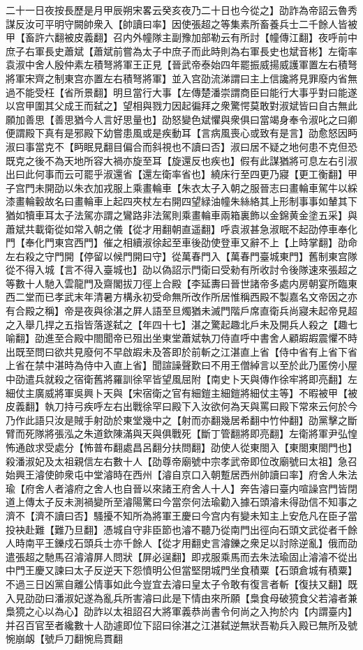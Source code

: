二十一日夜按長歷是月甲辰朔宋畧云癸亥夜乃二十日也今從之】劭詐為帝詔云魯秀謀反汝可平明守闕帥衆入【帥讀曰率】因使張超之等集素所畜養兵士二千餘人皆被甲【畜許六翻被皮義翻】召内外幢隊主副豫加部勒云有所討【幢傳江翻】夜呼前中庶子右軍長史蕭斌【蕭斌前嘗為太子中庶子而此時則為右軍長史也斌音彬】左衛率袁淑中舍人殷仲素左積弩將軍王正見【晉武帝泰始四年罷振威揚威護軍置左右積弩將軍宋齊之制東宫亦置左右積弩將軍】並入宫劭流涕謂曰主上信讒將見罪廢内省無過不能受枉【省所景翻】明旦當行大事【左傳楚潘崇謂商臣曰能行大事乎對曰能遂以宫甲圍其父成王而弑之】望相與戮力因起徧拜之衆驚愕莫敢對淑斌皆曰自古無此願加善思【善思猶今人言好思量也】劭怒變色斌懼與衆俱曰當竭身奉令淑叱之曰卿便謂殿下真有是邪殿下幼嘗患風或是疾動耳【言病風喪心或致有是言】劭愈怒因眄淑曰事當克不【眄眠見翻目偏合而斜視也不讀曰否】淑曰居不疑之地何患不克但恐既克之後不為天地所容大禍亦旋至耳【旋還反也疾也】假有此謀猶將可息左右引淑出曰此何事而云可罷乎淑還省【還左衛率省也】繞床行至四更乃寢【更工衡翻】甲子宫門未開劭以朱衣加戎服上乘畫輪車【朱衣太子入朝之服晉志曰畫輪車駕牛以綵漆畫輪轂故名曰畫輪車上起四夾杖左右開四望緑油幢朱絲絡其上形制事事如輦其下猶如犢車耳太子法駕亦謂之鸞路非法駕則乘畫輪車兩箱裏飾以金錦黄金塗五采】與蕭斌共載衛從如常入朝之儀【從才用翻朝直遥翻】呼袁淑甚急淑眠不起劭停車奉化門【奉化門東宫西門】催之相續淑徐起至車後劭使登車又辭不上【上時掌翻】劭命左右殺之守門開【停留以候門開曰守】從萬春門入【萬春門臺城東門】舊制東宫隊從不得入城【言不得入臺城也】劭以偽詔示門衛曰受勑有所收討令後隊速來張超之等數十人馳入雲龍門及齋閣拔刀徑上合殿【李延夀曰晉世諸帝多處内房朝宴所臨東西二堂而已孝武末年清暑方構永初受命無所改作所居惟稱西殿不製嘉名文帝因之亦有合殿之稱】帝是夜與徐湛之屛人語至旦燭猶未滅門階戶席直衛兵尚寢未起帝見超之入舉几捍之五指皆落遂弑之【年四十七】湛之驚起趣北戶未及開兵人殺之【趣七喻翻】劭進至合殿中閤聞帝已殂出坐東堂蕭斌執刀侍直呼中書舍人顧嘏嘏震懼不時出既至問曰欲共見廢何不早啟嘏未及答即於前斬之江湛直上省【侍中省有上省下省上省在禁中湛時為侍中入直上省】聞諠譟聲歎曰不用王僧綽言以至於此乃匿傍小屋中劭遣兵就殺之宿衛舊將羅訓徐罕皆望風屈附【南史卜天與傳作徐牢將即亮翻】左細仗主廣威將軍吳興卜天與【宋宿衛之官有細鎧主細鎧將細仗主等】不暇被甲【被皮義翻】執刀持弓疾呼左右出戰徐罕曰殿下入汝欲何為天與罵曰殿下常來云何於今乃作此語只汝是賊手射劭於東堂幾中之【射而亦翻幾居希翻中竹仲翻】劭黨擊之斷臂而死隊將張泓之朱道欽陳滿與天與俱戰死【斷丁管翻將即亮翻】左衛將軍尹弘惶怖通啟求受處分【怖普布翻處昌呂翻分扶問翻】劭使人從東閤入【東閤東閤門也】殺潘淑妃及太祖親信左右數十人【劭尊帝廟號中宗孝武帝即位改廟號曰太祖】急召始興王濬使帥衆屯中堂濬時在西州【濬自京口入朝蹔居西州帥讀曰率】府舍人朱法瑜【府舍人者濬府之舍人也自晉以來諸王府舍人十人】奔告濬曰臺内喧譟宫門皆閉道上傳太子反未測禍變所至濬陽驚曰今當奈何法瑜勸入據石頭濬未得劭信不知事之濟不【濟不讀曰否】騷擾不知所為將軍王慶曰今宫内有變未知主上安危凡在臣子當投袂赴難【難乃旦翻】憑城自守非臣節也濬不聽乃從南門出徑向石頭文武從者千餘人時南平王鑠戍石頭兵士亦千餘人【從才用翻史言濬鑠之衆足以討除逆亂】俄而劭遣張超之馳馬召濬濬屏人問狀【屏必逞翻】即戎服乘馬而去朱法瑜固止濬濬不從出中門王慶又諫曰太子反逆天下怨憤明公但當堅閉城門坐食積粟【石頭倉城有積粟】不過三日凶黨自離公情事如此今豈宜去濬曰皇太子令敢有復言者斬【復扶又翻】既入見劭劭曰潘淑妃遂為亂兵所害濬曰此是下情由來所願【梟食母破獍食父若濬者兼梟獍之心以為心】劭詐以太祖詔召大將軍義恭尚書令何尚之入拘於内【内謂臺内】并召百官至者纔數十人劭遽即位下詔曰徐湛之江湛弑逆無狀吾勒兵入殿已無所及號惋崩衂【號戶刀翻惋烏貫翻